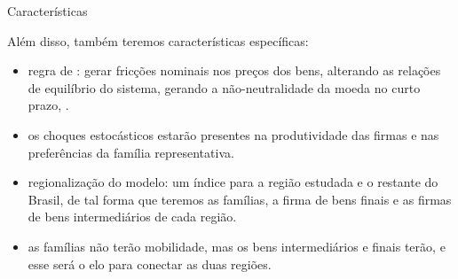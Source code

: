 \documentclass[10pt]{beamer}
\let\olditem\item
\renewcommand{\item}{%
	\olditem\vspace{5pt}}
\begin{document}
\begin{frame}{Características}

Além disso, também teremos características específicas:

\begin{itemize}
	\item regra de \textcite{calvo_staggered_1983}: gerar fricções nominais nos preços dos bens, alterando as relações de equilíbrio do sistema, gerando a não-neutralidade da moeda no curto prazo, \textcite[p.191]{costa_junior_understanding_2016}.
	
	\item os choques estocásticos estarão presentes na produtividade das firmas e nas preferências da família representativa.
	
	\item regionalização do modelo: um índice para a região estudada e o restante do Brasil, de tal forma que teremos as famílias, a firma de bens finais e as firmas de bens intermediários de cada região.
	
	\item as famílias não terão mobilidade, mas os bens intermediários e finais terão, e esse será o elo para conectar as duas regiões.
\end{itemize}

\end{frame}
	
	
		
\end{document}
